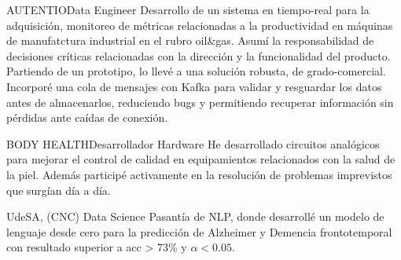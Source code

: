 {        
        {AUTENTIO}{Data Engineer}
        {Desarrollo de un sistema en tiempo-real para la adquisición, monitoreo de métricas relacionadas a la productividad en máquinas de manufatctura industrial en el rubro oil\&gas. Asumí la responsabilidad de decisiones críticas relacionadas con la dirección y la funcionalidad del producto. Partiendo de un prototipo, lo llevé a una solución robusta, de grado-comercial. Incorporé una cola de mensajes con Kafka para validar y resguardar los datos antes de almacenarlos, reduciendo bugs y permitiendo recuperar información sin pérdidas ante caídas de conexión.\\[0.6em]
        }

        {BODY HEALTH}{Desarrollador Hardware}
        {He desarrollado circuitos analógicos para mejorar el control de calidad en equipamientos relacionados con la salud de la piel. Además participé activamente en la resolución de problemas imprevistos que surgían día a día.\\[0.6em]
        }

        {UdeSA, (CNC)}
        {Data Science}
        {Pasantía de NLP, donde desarrollé un modelo de lenguaje desde cero para la predicción de Alzheimer y Demencia frontotemporal con resultado superior a {\color{red} acc > 73\%} y {\color{red} $\alpha <0.05$}.\\[0.6em]
        }
    }
